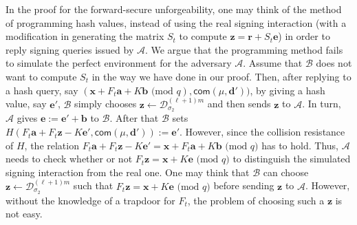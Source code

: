 \documentclass[runningheads]{llncs}
\begin{document}
\begin{remark}
In the proof for the forward-secure unforgeability, 
one may think of the method of programming hash values, instead of using the real signing interaction (with a modification in generating the matrix $S_t$ to compute $\mathbf{z}=\mathbf{r}+S_t\mathbf{e}$) in order to reply signing queries issued by $\mathcal{A}$. 
We argue that the programming method fails to simulate the perfect environment for the adversary $\mathcal{A}$. 
Assume that $\mathcal{B}$ does not want to compute $S_t$ in the way
we have done in our proof. 
Then, after replying to a hash query, 
say $(\mathbf{x}+F_t\mathbf{a}+K\mathbf{b} \text{ (mod } q), \textsf{com}(\mu, \textbf{d}'))$, 
by giving a hash value, say $\textbf{e}'$, 
$\mathcal{B}$ simply chooses $\textbf{z} \leftarrow \mathcal{D}_{\sigma_2}^{(\ell+1)m}$ 
and then sends $\textbf{z}$ to $\mathcal{A}$. In turn, $\mathcal{A}$ gives $\mathbf{e}:=\mathbf{e}'+\mathbf{b}$ to $\mathcal{B}$. 
After that $\mathcal{B}$ sets $H(F_t\mathbf{a}+F_t\mathbf{z}-K\mathbf{e}',\textsf{com}(\mu, \textbf{d}')):=\textbf{e}'$. 
However,  since the collision resistance of $H$, 
the relation
$F_t\mathbf{a}+F_t\mathbf{z}-K\mathbf{e}'=\mathbf{x}+F_t\mathbf{a}+K\mathbf{b} \text{ (mod } q)$ has to hold. 
Thus, $\mathcal{A}$  needs to check whether or not $F_t\mathbf{z} =\mathbf{x}+K\mathbf{e} \text{ (mod } q)$ 
to distinguish the simulated signing interaction from the real one. 
One may think that $\mathcal{B}$ can choose $\textbf{z} \leftarrow \mathcal{D}_{\sigma_2}^{(\ell+1)m}$  
such that $F_t\mathbf{z} =\mathbf{x}+K\mathbf{e} \text{ (mod } q)$ before sending $\textbf{z}$ to $\mathcal{A}$. 
However, without the knowledge of a trapdoor for $F_t$, the problem of choosing such a $\textbf{z}$ is  not easy.
\end{remark}
\end{document}
